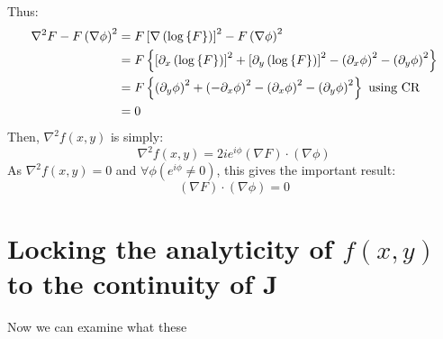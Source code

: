 \documentclass{article}
\begin{document}
Thus:
\begin{align}
    \nabla^2 F - F \left( \nabla \phi \right)^2 &= F \left[ \nabla \left( \log \left\{ F \right\}
        \right) \right]^2 - F \left( \nabla \phi \right)^2 \\
    &= F \left\{ \left[ \partial_x \left( \log \left\{ F \right\} \right) \right]^2
       + \left[ \partial_y \left( \log \left\{ F \right\} \right) \right]^2
       - \left( \partial_x \phi \right)^2
       - \left( \partial_y \phi \right)^2 \right\} \\
    &= F \left\{ \left( \partial_y \phi \right)^2
       + \left( - \partial_x \phi \right)^2
       - \left( \partial_x \phi \right)^2
       - \left( \partial_y \phi \right)^2 \right\} ~\textrm{using CR}\\
    &= 0
\end{align}
Then, $\nabla^2 f(x,y)$ is simply:
\begin{equation}
    \nabla^2 f(x,y) = 2 i e^{i \phi} \left( \nabla F \right) \cdot \left( \nabla
        \phi \right)
\end{equation}
As $\nabla^2 f(x,y) = 0$ and $\forall \phi \left( e^{i \phi} \neq 0 \right)$,
this gives the important result:
\begin{equation}
    \left( \nabla F \right) \cdot \left( \nabla \phi \right) = 0
\end{equation}

\section{Locking the analyticity of $f(x,y)$ to the continuity of $\mathbf{J}$}

Now we can examine what these
\end{document}
